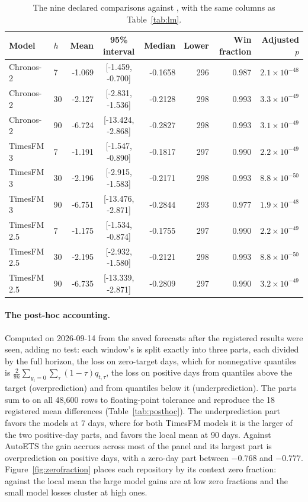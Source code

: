 \begin{table}[htbp]
\centering\small
\caption{The nine declared comparisons against \aets{}, with the same columns as Table~\ref{tab:lm}.}
\label{tab:ae}
\begin{tabular}{llrcrrrr}
\toprule
Model & $h$ & Mean & 95\% interval & Median & Lower & Win fraction & Adjusted $p$ \\
\midrule
Chronos-2 & 7 & -1.069 & [-1.459, -0.700] & -0.1658 & 296 & 0.987 & $2.1 \times 10^{-48}$ \\
Chronos-2 & 30 & -2.127 & [-2.831, -1.536] & -0.2128 & 298 & 0.993 & $3.3 \times 10^{-49}$ \\
Chronos-2 & 90 & -6.724 & [-13.424, -2.868] & -0.2827 & 298 & 0.993 & $3.1 \times 10^{-49}$ \\
TimesFM 3 & 7 & -1.191 & [-1.547, -0.890] & -0.1817 & 297 & 0.990 & $2.2 \times 10^{-49}$ \\
TimesFM 3 & 30 & -2.196 & [-2.915, -1.583] & -0.2171 & 298 & 0.993 & $8.8 \times 10^{-50}$ \\
TimesFM 3 & 90 & -6.751 & [-13.476, -2.871] & -0.2844 & 293 & 0.977 & $1.9 \times 10^{-48}$ \\
TimesFM 2.5 & 7 & -1.175 & [-1.534, -0.874] & -0.1755 & 297 & 0.990 & $2.2 \times 10^{-49}$ \\
TimesFM 2.5 & 30 & -2.195 & [-2.932, -1.580] & -0.2121 & 298 & 0.993 & $8.8 \times 10^{-50}$ \\
TimesFM 2.5 & 90 & -6.735 & [-13.339, -2.871] & -0.2809 & 297 & 0.990 & $3.2 \times 10^{-49}$ \\
\bottomrule
\end{tabular}
\end{table}

\paragraph{The post-hoc accounting.} Computed on 2026-09-14 from the saved forecasts after the registered
results were seen, adding no test: each window's \qs{} is split exactly into three parts, each divided by the
full horizon, the loss on zero-target days, which for nonnegative quantiles is
$\frac{2}{9h}\sum_{y_t = 0}\sum_\tau (1-\tau) q_{t,\tau}$, the loss on positive days from quantiles above the
target (overprediction) and from quantiles below it (underprediction). The parts sum to \qs{} on all 48,600
rows to floating-point tolerance and reproduce the 18 registered mean differences (Table~\ref{tab:posthoc}).
The underprediction part favors the models at 7 days, where for both TimesFM models it is the larger of the
two positive-day parts, and favors the local mean at 90 days. Against AutoETS the gain accrues across most
of the panel and its largest part is overprediction on positive days, with a zero-day part between $-0.768$
and $-0.777$. Figure~\ref{fig:zerofraction} places each repository by its context zero fraction: against the
local mean the large model gains are at low zero fractions and the small model losses cluster at high ones.

